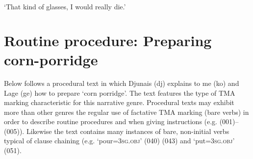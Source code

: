 {\glt
‘That kind of glasses, I would really die.’
  }\z
\section{Routine procedure: Preparing corn-porridge}

Below follows a procedural text in which Djunais (dj) explains to me (ko) and Lage (ge) how to prepare  ‘corn porridge’. The text features the type of TMA marking characteristic for this narrative genre. Procedural texts may exhibit more than other genres the regular use of factative TMA marking (bare verbs) in order to describe routine procedures and when giving instructions (e.g. (001)–(005)). Likewise the text contains many instances of bare, non-initial verbs typical of clause chaining (e.g.  ‘pour=\textsc{3sg.obj}’ (040)  (043) and  ‘put=\textsc{3sg.obj}’ (051).


